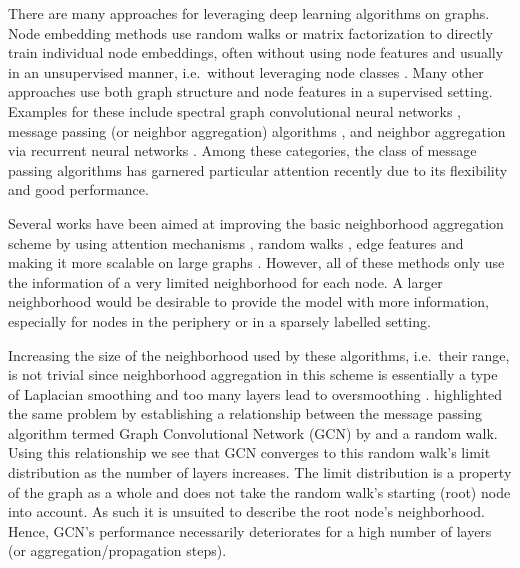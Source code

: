 \documentclass{article} \usepackage{iclr2019_conference,times}
\begin{document}
There are many approaches for leveraging deep learning algorithms on graphs. Node embedding methods use random walks or matrix factorization to directly train individual node embeddings, often without using node features and usually in an unsupervised manner, i.e.\ without leveraging node classes \citep{perozzi_deepwalk:_2014,tang_line:_2015,nandanwar_structural_2016,grover_node2vec:_2016,qiu_network_2018}. Many other approaches use both graph structure and node features in a supervised setting. Examples for these include spectral graph convolutional neural networks \citep{bruna_spectral_2014,defferrard_convolutional_2016}, message passing (or neighbor aggregation) algorithms \citep{kearnes_molecular_2016,kipf_semi-supervised_2017,hamilton_inductive_2017,pham_column_2017,monti_geometric_2017,gilmer_neural_2017}, and neighbor aggregation via recurrent neural networks \citep{scarselli_graph_2009,li_gated_2016,dai_learning_2018}.
Among these categories, the class of message passing algorithms has garnered particular attention recently due to its flexibility and good performance.

Several works have been aimed at improving the basic neighborhood aggregation scheme by using attention mechanisms \citep{kearnes_molecular_2016,hamilton_inductive_2017,velickovic_graph_2018}, random walks \citep{abu-el-haija_n-gcn:_2018,ying_graph_2018,li_deeper_2018}, edge features \citep{kearnes_molecular_2016,gilmer_neural_2017,schlichtkrull_modeling_2018} and making it more scalable on large graphs \citep{chen_fastgcn:_2018,ying_graph_2018}. However, all of these methods only use the information of a very limited neighborhood for each node. A larger neighborhood would be desirable to provide the model with more information, especially for nodes in the periphery or in a sparsely labelled setting.

Increasing the size of the neighborhood used by these algorithms, i.e.\ their range, is not trivial since neighborhood aggregation in this scheme is essentially a type of Laplacian smoothing and too many layers lead to oversmoothing \citep{li_deeper_2018}. \citet{xu_representation_2018} highlighted the same problem by establishing a relationship between the message passing algorithm termed Graph Convolutional Network (GCN) by \citet{kipf_semi-supervised_2017} and a random walk. Using this relationship we see that GCN converges to this random walk's limit distribution as the number of layers increases. The limit distribution is a property of the graph as a whole and does not take the random walk's starting (root) node into account. As such it is unsuited to describe the root node's neighborhood. Hence, GCN's performance necessarily deteriorates for a high number of layers (or aggregation/propagation steps).
\end{document}

